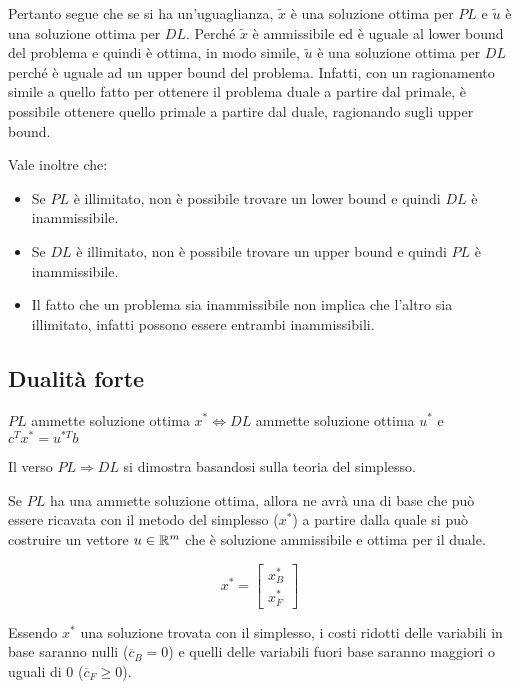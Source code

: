Pertanto segue che se si ha un'uguaglianza, $\tilde{x}$ è una soluzione ottima per $PL$ e $\tilde{u}$ è una soluzione ottima per $DL$.
Perché $\tilde{x}$ è ammissibile ed è uguale al lower bound del problema e quindi è ottima, in modo simile, $\tilde{u}$ è una soluzione ottima per $DL$ perché è uguale ad un upper bound del problema.
Infatti, con un ragionamento simile a quello fatto per ottenere il problema duale a partire dal primale, è possibile ottenere quello primale a partire dal duale, ragionando sugli upper bound.

Vale inoltre che:

\begin{itemize}
	\item Se $PL$ è illimitato, non è possibile trovare un lower bound e quindi $DL$ è inammissibile.
	\item Se $DL$ è illimitato, non è possibile trovare un upper bound e quindi $PL$ è inammissibile.
	\item Il fatto che un problema sia inammissibile non implica che l'altro sia illimitato, infatti possono essere entrambi inammissibili.
\end{itemize}

\subsection{Dualità forte}

\begin{center}
	$PL$ ammette soluzione ottima $x^* \Leftrightarrow DL$ ammette soluzione ottima $u^*$ e $c^Tx^* = u^{*T}b$ 
\end{center}

Il verso $PL\Rightarrow DL$ si dimostra basandosi sulla teoria del simplesso.

Se $PL$ ha una ammette soluzione ottima, allora ne avrà una di base che può essere ricavata con il metodo del simplesso ($x^*$) a partire dalla quale si può costruire un vettore $u \in \mathbb{R}^m$ che è soluzione ammissibile e ottima per il duale.

$$
x^* = \begin{bmatrix}
x_{B}^* \\
x_{F}^*
\end{bmatrix}
$$

Essendo $x^*$ una soluzione trovata con il simplesso, i costi ridotti delle variabili in base saranno nulli ($\overline{c}_B = 0$) e quelli delle variabili fuori base saranno maggiori o uguali di 0 ($\overline{c}_F \geq 0$).

